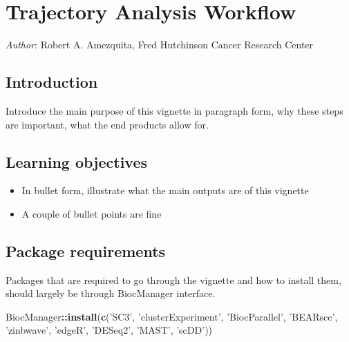 \documentclass[]{book}
\newenvironment{Shaded}{\begin{snugshade}}{\end{snugshade}}
\newcommand{\KeywordTok}[1]{\textcolor[rgb]{0.13,0.29,0.53}{\textbf{#1}}}
\newcommand{\NormalTok}[1]{#1}
\newcommand{\OperatorTok}[1]{\textcolor[rgb]{0.81,0.36,0.00}{\textbf{#1}}}
\newcommand{\StringTok}[1]{\textcolor[rgb]{0.31,0.60,0.02}{#1}}
\providecommand{\tightlist}{%
  \setlength{\itemsep}{0pt}\setlength{\parskip}{0pt}}
\begin{document}
\hypertarget{trajectory-analysis-workflow}{%
\chapter{Trajectory Analysis Workflow}\label{trajectory-analysis-workflow}}

\emph{Author}: Robert A. Amezquita, Fred Hutchinson Cancer Research Center

\hypertarget{introduction-1}{%
\section{Introduction}\label{introduction-1}}

Introduce the main purpose of this vignette in paragraph form, why these steps are important, what the end products allow for.

\hypertarget{learning-objectives-1}{%
\section{Learning objectives}\label{learning-objectives-1}}

\begin{itemize}
\tightlist
\item
  In bullet form, illustrate what the main outputs are of this vignette
\item
  A couple of bullet points are fine
\end{itemize}

\hypertarget{package-requirements-1}{%
\section{Package requirements}\label{package-requirements-1}}

Packages that are required to go through the vignette and how to install them, should largely be through BiocManager interface.

\begin{Shaded}
\begin{Highlighting}[]
\NormalTok{BiocManager}\OperatorTok{::}\KeywordTok{install}\NormalTok{(}\KeywordTok{c}\NormalTok{(}\StringTok{'SC3'}\NormalTok{, }\StringTok{'clusterExperiment'}\NormalTok{, }\StringTok{'BiocParallel'}\NormalTok{, }\StringTok{'BEARscc'}\NormalTok{, }\StringTok{'zinbwave'}\NormalTok{, }\StringTok{'edgeR'}\NormalTok{, }\StringTok{'DESeq2'}\NormalTok{, }\StringTok{'MAST'}\NormalTok{, }\StringTok{'scDD'}\NormalTok{))}
\end{Highlighting}
\end{Shaded}
\end{document}
